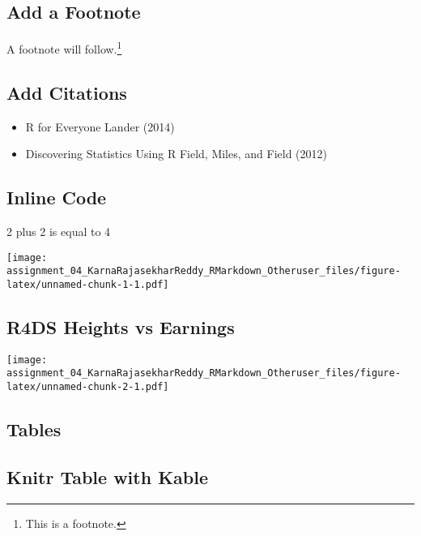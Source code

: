 \documentclass[
]{article}
\providecommand{\tightlist}{%
  \setlength{\itemsep}{0pt}\setlength{\parskip}{0pt}}
\begin{document}
\hypertarget{add-a-footnote}{%
\subsection{Add a Footnote}\label{add-a-footnote}}

A footnote will follow.\footnote{This is a footnote.}

\hypertarget{add-citations}{%
\subsection{Add Citations}\label{add-citations}}

\begin{itemize}
\tightlist
\item
  R for Everyone Lander (2014)
\item
  Discovering Statistics Using R Field, Miles, and Field (2012)
\end{itemize}

\hypertarget{inline-code}{%
\subsection{Inline Code}\label{inline-code}}

2 plus 2 is equal to 4

\texttt{[image: assignment\_04\_KarnaRajasekharReddy\_RMarkdown\_Otheruser\_files/figure-latex/unnamed-chunk-1-1.pdf]}

\hypertarget{r4ds-heights-vs-earnings}{%
\subsection{R4DS Heights vs Earnings}\label{r4ds-heights-vs-earnings}}

\texttt{[image: assignment\_04\_KarnaRajasekharReddy\_RMarkdown\_Otheruser\_files/figure-latex/unnamed-chunk-2-1.pdf]}

\hypertarget{tables}{%
\subsection{Tables}\label{tables}}

\hypertarget{knitr-table-with-kable}{%
\subsection{Knitr Table with Kable}\label{knitr-table-with-kable}}
\end{document}
